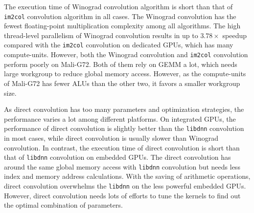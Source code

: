 \documentclass{article}
\begin{document}
The execution time of Winograd convolution algorithm is short than that of \texttt{im2col} convolution algorithm in all cases. The Winograd convolution has the fewest floating-point multiplication complexity among all algorithms. The high thread-level parallelism of Winograd convolution results in up to $3.78 \times$ speedup compared with the \texttt{im2col} convolution on dedicated GPUs, which has many compute-units. However, both the Winograd convolution and \texttt{im2col} convolution perform poorly on Mali-G72. Both of them rely on GEMM a lot, which needs large workgroup to reduce global memory access. However, as the compute-units of Mali-G72 has fewer ALUs than the other two, it favors a smaller workgroup size.

As direct convolution has too many parameters and optimization strategies, the performance varies a lot among different platforms.  On integrated GPUs, the performance of direct convolution is slightly better than the \texttt{libdnn} convolution in most cases, while direct convolution is usually slower than Winograd convolution. In contrast, the execution time of direct convolution is short than that of \texttt{libdnn} convolution on embedded GPUs. The direct convolution has around the same global memory access with \texttt{libdnn} convolution but needs less index and memory address calculations. With the saving of arithmetic operations, direct convolution overwhelms the \texttt{libdnn} on the less powerful embedded GPUs. However, direct convolution needs lots of efforts to tune the kernels to find out the optimal combination of parameters.



\end{document}
